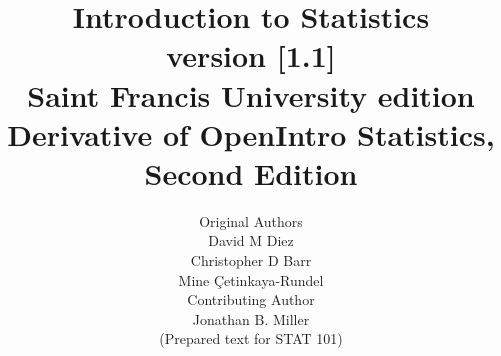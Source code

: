 

\title{\huge Introduction to Statistics \\[2mm]
\large version [1.1] \\
Saint Francis University edition \\
\normalsize Derivative of OpenIntro Statistics, Second Edition}


\author{\Large Original Authors \\[1.5mm]
\normalsize David M Diez \\
\normalsize Christopher D Barr \\
\normalsize Mine \c{C}etinkaya-Rundel \\[8mm]
\Large Contributing Author \\[1.5mm]
\normalsize Jonathan B. Miller \\
\small (Prepared text for STAT 101) \\[2mm]
}

